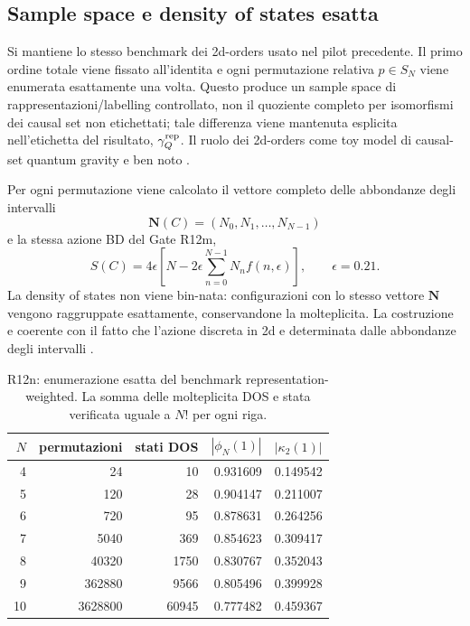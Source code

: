 \documentclass[11pt,a4paper]{article}
\begin{document}
\subsection{Sample space e density of states esatta}

Si mantiene lo stesso benchmark dei 2d-orders usato nel pilot precedente. Il primo ordine totale viene fissato all'identita e ogni permutazione relativa $p\in S_N$ viene enumerata esattamente una volta. Questo produce un sample space di rappresentazioni/labelling controllato, non il quoziente completo per isomorfismi dei causal set non etichettati; tale differenza viene mantenuta esplicita nell'etichetta del risultato, $\gamma_Q^{\rm rep}$. Il ruolo dei 2d-orders come toy model di causal-set quantum gravity e ben noto \cite{BrightwellHensonSurya2008,GlaserOConnorSurya2018}.

Per ogni permutazione viene calcolato il vettore completo delle abbondanze degli intervalli
\begin{equation}
 \mathbf N(C)=(N_0,N_1,\ldots,N_{N-1})
\end{equation}
e la stessa azione BD del Gate R12m,
\begin{equation}
 S(C)=4\epsilon\left[N-2\epsilon\sum_{n=0}^{N-1}N_n f(n,\epsilon)\right],\qquad \epsilon=0.21.
\end{equation}
La density of states non viene bin-nata: configurazioni con lo stesso vettore $\mathbf N$ vengono raggruppate esattamente, conservandone la molteplicita. La costruzione e coerente con il fatto che l'azione discreta in 2d e determinata dalle abbondanze degli intervalli \cite{BenincasaDowkerSchmitzer2011}.

\begin{table}[htbp]
\centering
\caption{R12n: enumerazione esatta del benchmark representation-weighted. La somma delle molteplicita DOS e stata verificata uguale a $N!$ per ogni riga.}
\begin{tabular}{r r r r r}
\toprule
$N$ & permutazioni & stati DOS & $|\phi_N(1)|$ & $|\kappa_2(1)|$\\
\midrule
4  & 24      & 10    & 0.931609 & 0.149542\\
5  & 120     & 28    & 0.904147 & 0.211007\\
6  & 720     & 95    & 0.878631 & 0.264256\\
7  & 5040    & 369   & 0.854623 & 0.309417\\
8  & 40320   & 1750  & 0.830767 & 0.352043\\
9  & 362880  & 9566  & 0.805496 & 0.399928\\
10 & 3628800 & 60945 & 0.777482 & 0.459367\\
\bottomrule
\end{tabular}
\end{table}
\end{document}

